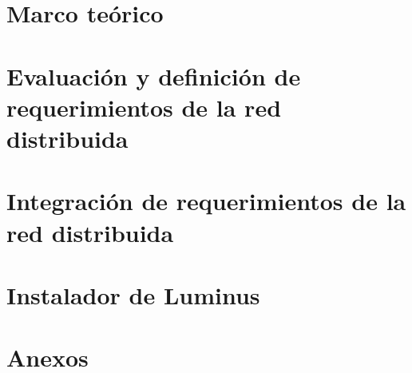 \documentclass[10pt]{book}
\begin{document}
	\chapter{Marco teórico}\label{cap:Cap2}
	
	\chapter{Evaluación y definición de requerimientos de la red distribuida}\label{cap:Cap3}
	\chapter{Integración de requerimientos de la red distribuida}\label{cap:Cap4}
	\chapter{Instalador de Luminus}\label{cap:Cap5}
	
	
	\chapter{Anexos}
	
\end{document}
